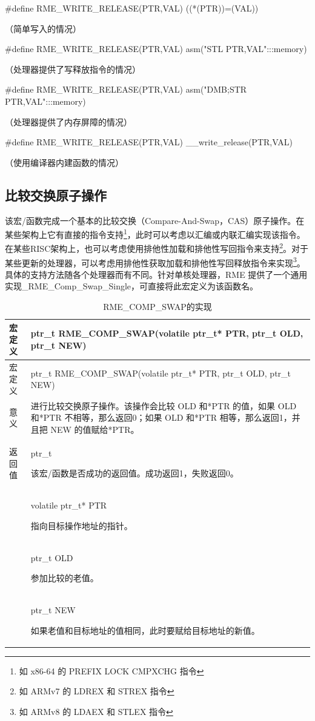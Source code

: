 \#define RME\_WRITE\_RELEASE(PTR,VAL) ((*(PTR))=(VAL))

（简单写入的情况）

\#define RME\_WRITE\_RELEASE(PTR,VAL) asm("STL PTR,VAL":::memory)

（处理器提供了写释放指令的情况）

\#define RME\_WRITE\_RELEASE(PTR,VAL) asm("DMB;STR PTR,VAL":::memory)

（处理器提供了内存屏障的情况）

\#define RME\_WRITE\_RELEASE(PTR,VAL) \_\_write\_release(PTR,VAL)

（使用编译器内建函数的情况）

\subsection{比较交换原子操作}\label{subsec:7-compare-and-swap-atomic-operation}

该宏/函数完成一个基本的比较交换（Compare-And-Swap，CAS）原子操作。在某些架构上它有直接的指令支持\footnote{如 x86-64 的 PREFIX LOCK CMPXCHG 指令}，此时可以考虑以汇编或内联汇编实现该指令。在某些RISC架构上，也可以考虑使用排他性加载和排他性写回指令来支持\footnote{如 ARMv7 的 LDREX 和 STREX 指令}。对于某些更新的处理器，可以考虑用排他性获取加载和排他性写回释放指令来实现\footnote{如 ARMv8 的 LDAEX 和 STLEX 指令}。具体的支持方法随各个处理器而有不同。针对单核处理器，RME 提供了一个通用实现\_RME\_Comp\_Swap\_Single，可直接将此宏定义为该函数名。

\begin{xltabular}{\textwidth}{@{}>{\hsize\raggedright\arraybackslash}X>{\hsize\raggedright\arraybackslash}X@{}}
\caption{RME\_COMP\_SWAP的实现}\label{tab:7-31-rme-comp-swap-implementation}\\
\toprule
宏定义 & ptr\_t RME\_COMP\_SWAP(volatile ptr\_t* PTR, ptr\_t OLD, ptr\_t
NEW)\tabularnewline
\endfirsthead
\toprule
宏定义 & ptr\_t RME\_COMP\_SWAP(volatile ptr\_t* PTR, ptr\_t OLD, ptr\_t
NEW)\tabularnewline
\midrule
\endhead
\bottomrule
\endlastfoot
意义 &
进行比较交换原子操作。该操作会比较 OLD 和*PTR 的值，如果 OLD 和*PTR 不相等，那么返回0；如果 OLD 和*PTR 相等，那么返回1，并且把 NEW 的值赋给*PTR。\tabularnewline
返回值\strut
 & ptr\_t

该宏/函数是否成功的返回值。成功返回1，失败返回0。\strut
\tabularnewline
{} & volatile ptr\_t* PTR

指向目标操作地址的指针。\strut
\tabularnewline
\strut
 & ptr\_t OLD

参加比较的老值。\strut
\tabularnewline
\strut
 & ptr\_t NEW

如果老值和目标地址的值相同，此时要赋给目标地址的新值。\strut
\tabularnewline
\end{xltabular}

